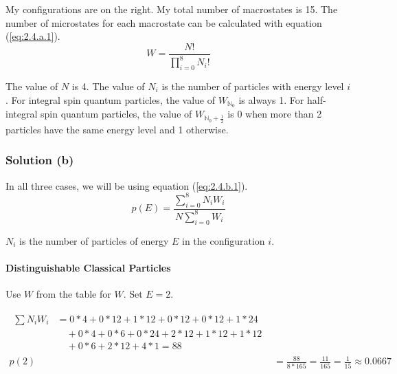 \documentclass[12pt]{article}
\begin{document}
            My configurations are on the right. 
            My total number of macrostates is 15.
            The number of microstates for each macrostate can be calculated with equation (\ref{eq:2.4.a.1}).
            \begin{equation}
                \label{eq:2.4.a.1}
                W = \frac{N!}{\prod_{i=0}^8 N_i !}
            \end{equation}

            The value of $N$ is 4.
            The value of $N_i$ is the number of particles with energy level $i$.
            For integral spin quantum particles, the value of $W_{\mathbb{N}_0}$ is always 1.
            For half-integral spin quantum particles, the value of $W_{\mathbb{N}_0 + \frac{1}{2}}$ is 0 when more than 2 particles have the same energy level and 1 otherwise.

        \subsubsection{Solution (b)}
            In all three cases, we will be using equation (\ref{eq:2.4.b.1}).
            \begin{equation}
                \label{eq:2.4.b.1}
                p(E) = \frac{\sum_{i=0}^{8} N_i W_i}{N \sum_{i = 0}^{8} W_i}
            \end{equation}
            
            $N_i$ is the number of particles of energy $E$ in the configuration $i$.

            \paragraph{Distinguishable Classical Particles}
                Use $W$ from the table for $W$. 
                Set $E = 2$.
                
                \begin{align}
                    \begin{split}
                        \sum N_i W_i    &= 0*4 + 0*12 + 1*12 + 0*12 + 0*12 + 1*24 \\
                                        &\quad + 0*4 + 0*6 + 0*24 + 2*12 + 1*12 + 1*12\\ 
                                        &\quad + 0*6 + 2*12 + 4*1 = 88
                    \end{split}\\
                    p(2)    &=  \frac{88}{8*165}
                            =   \frac{11}{165}
                            =   \boxed{\frac{1}{15} \approx 0.0667}
                \end{align}
\end{document}
